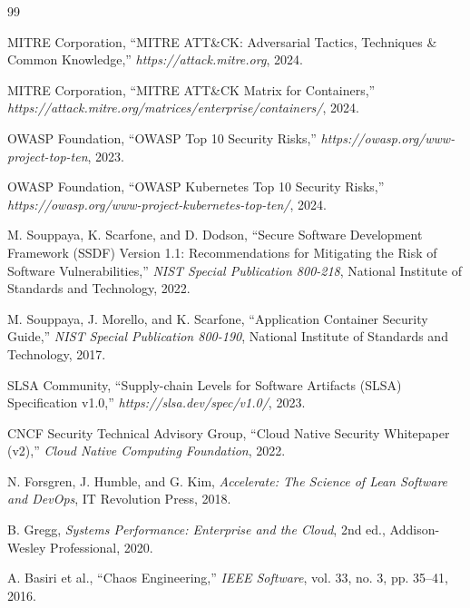 \documentclass[12pt,a4paper]{report}
\begin{document}
\bigskip
%
\tableofcontents
\listoffigures
\listoftables
\newpage
%
%
%
%


\begin{thebibliography}{99}

MITRE Corporation, ``MITRE ATT\&CK: Adversarial Tactics, Techniques \& Common Knowledge,'' \textit{https://attack.mitre.org}, 2024.

MITRE Corporation, ``MITRE ATT\&CK Matrix for Containers,'' \textit{https://attack.mitre.org/matrices/enterprise/containers/}, 2024.

OWASP Foundation, ``OWASP Top 10 Security Risks,'' \textit{https://owasp.org/www-project-top-ten}, 2023.

OWASP Foundation, ``OWASP Kubernetes Top 10 Security Risks,'' \textit{https://owasp.org/www-project-kubernetes-top-ten/}, 2024.

M. Souppaya, K. Scarfone, and D. Dodson, ``Secure Software Development Framework (SSDF) Version 1.1: Recommendations for Mitigating the Risk of Software Vulnerabilities,'' \textit{NIST Special Publication 800-218}, National Institute of Standards and Technology, 2022.

M. Souppaya, J. Morello, and K. Scarfone, ``Application Container Security Guide,'' \textit{NIST Special Publication 800-190}, National Institute of Standards and Technology, 2017.

SLSA Community, ``Supply-chain Levels for Software Artifacts (SLSA) Specification v1.0,'' \textit{https://slsa.dev/spec/v1.0/}, 2023.

CNCF Security Technical Advisory Group, ``Cloud Native Security Whitepaper (v2),'' \textit{Cloud Native Computing Foundation}, 2022.

N. Forsgren, J. Humble, and G. Kim, \textit{Accelerate: The Science of Lean Software and DevOps}, IT Revolution Press, 2018.

B. Gregg, \textit{Systems Performance: Enterprise and the Cloud}, 2nd ed., Addison-Wesley Professional, 2020.

A. Basiri et al., ``Chaos Engineering,'' \textit{IEEE Software}, vol. 33, no. 3, pp. 35--41, 2016.


\end{thebibliography}
\end{document}

